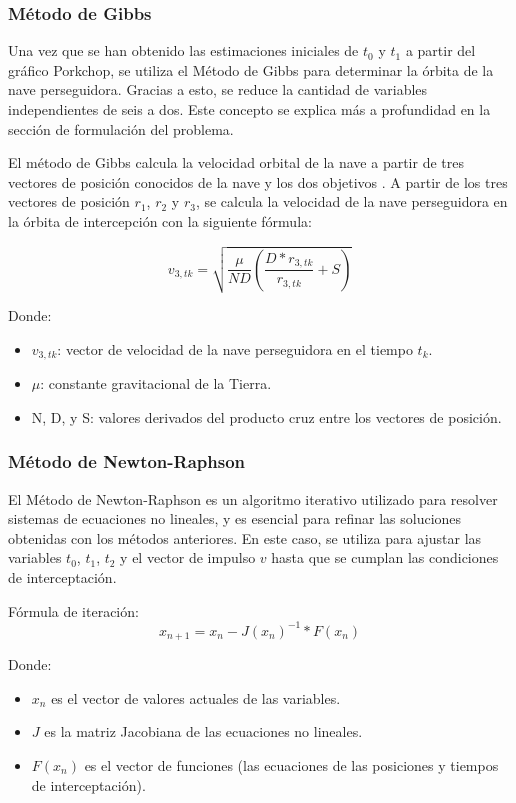 \subsubsection{Método de Gibbs}
Una vez que se han obtenido las estimaciones iniciales de $t_0$ y $t_1$ a
partir del gráfico Porkchop, se utiliza el Método de Gibbs para determinar la
órbita de la nave perseguidora. Gracias a esto, se reduce la cantidad de
variables independientes de seis a dos. Este concepto se explica más a
profundidad en la sección de formulación del problema.

El método de Gibbs calcula la velocidad orbital de la nave a partir de tres
vectores de posición conocidos de la nave y los dos objetivos
\parencite{HE2010265}. A partir de los tres vectores de posición $r_1$, $r_2$ y
$r_3$, se calcula la velocidad de la nave perseguidora en la órbita de
intercepción con la siguiente fórmula:

\begin{equation}
    v_{3,tk} = \sqrt{\frac{\mu}{ND} \left( \frac{D \ast r_{3,tk}}{r_{3,tk}} + S \right)}
\end{equation}

Donde:
\begin{itemize}
    \item $v_{3,tk}$: vector de velocidad de la nave perseguidora en el tiempo $t_k$.
    \item $\mu$: constante gravitacional de la Tierra.
    \item N, D, y S\@: valores derivados del producto cruz entre los vectores de
          posición.
\end{itemize}

\subsubsection{Método de Newton-Raphson}
El Método de Newton-Raphson es un algoritmo iterativo utilizado para resolver
sistemas de ecuaciones no lineales, y es esencial para refinar las soluciones
obtenidas con los métodos anteriores. En este caso, se utiliza para ajustar las
variables $t_0$, $t_1$, $t_2$ y el vector de impulso $v$ hasta que se cumplan
las condiciones de interceptación.

Fórmula de iteración:
\[
    x_{n+1} = x_n - J{(x_n)}^{-1} \ast F(x_n)
\]

Donde:
\begin{itemize}
    \item $x_n$ es el vector de valores actuales de las variables.
    \item $J$ es la matriz Jacobiana de las ecuaciones no lineales.
    \item $F(x_n)$ es el vector de funciones (las ecuaciones de las posiciones y tiempos de interceptación).
\end{itemize}
